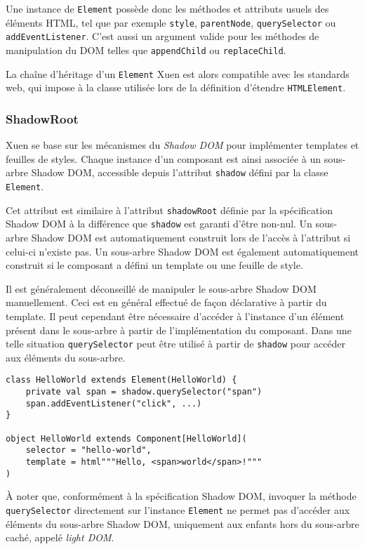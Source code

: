 Une instance de \texttt{Element} possède donc les méthodes et attributs usuels des éléments HTML, tel que par exemple \texttt{style}, \texttt{parentNode}, \texttt{querySelector} ou \texttt{addEventListener}. C'est aussi un argument valide pour les méthodes de manipulation du DOM telles que \texttt{appendChild} ou \texttt{replaceChild}.

La chaîne d'héritage d'un \texttt{Element} Xuen est alors compatible avec les standards web, qui impose à la classe utilisée lors de la définition d'étendre \texttt{HTMLElement}.

\subsubsection{ShadowRoot}
Xuen se base sur les mécanismes du \emph{Shadow DOM} pour implémenter templates et feuilles de styles. Chaque instance d'un composant est ainsi associée à un sous-arbre Shadow DOM, accessible depuis l'attribut \texttt{shadow} défini par la classe \texttt{Element}.

Cet attribut est similaire à l'attribut \texttt{shadowRoot} définie par la spécification Shadow DOM à la différence que \texttt{shadow} est garanti d'être non-nul. Un sous-arbre Shadow DOM est automatiquement construit lors de l'accès à l'attribut si celui-ci n'existe pas. Un sous-arbre Shadow DOM est également automatiquement construit si le composant a défini un template ou une feuille de style.

Il est généralement déconseillé de manipuler le sous-arbre Shadow DOM manuellement. Ceci est en général effectué de façon déclarative à partir du template. Il peut cependant être nécessaire d'accéder à l'instance d'un élément présent dans le sous-arbre à partir de l'implémentation du composant. Dans une telle situation \texttt{querySelector} peut être utilisé à partir de \texttt{shadow} pour accéder aux éléments du sous-arbre.

\begin{lstlisting}
class HelloWorld extends Element(HelloWorld) {
	private val span = shadow.querySelector("span")
	span.addEventListener("click", ...)
}

object HelloWorld extends Component[HelloWorld](
	selector = "hello-world",
	template = html"""Hello, <span>world</span>!"""
)
\end{lstlisting}

À noter que, conformément à la spécification Shadow DOM, invoquer la méthode \texttt{querySelector} directement sur l'instance \texttt{Element} ne permet pas d'accéder aux éléments du sous-arbre Shadow DOM, uniquement aux enfants hors du sous-arbre caché, appelé \emph{light DOM}.

